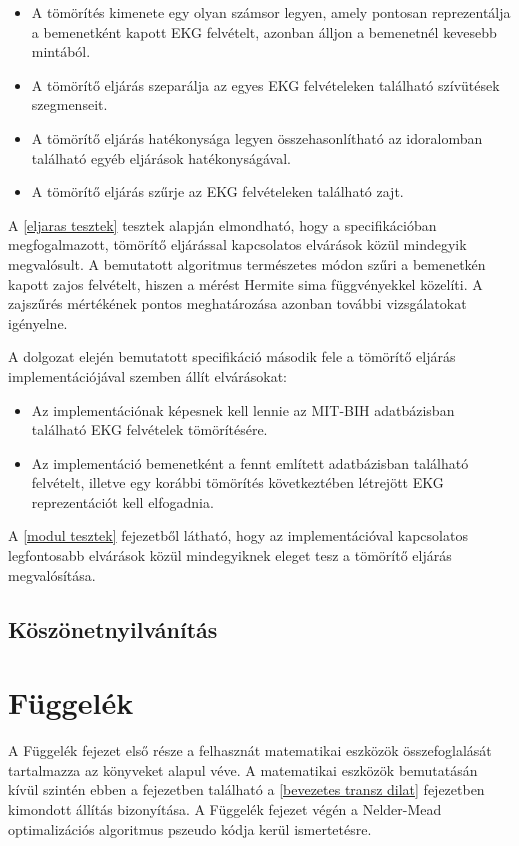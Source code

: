 \documentclass[oneside,titlepage,12pt,a4paper]{report}
\begin{document}
\begin{itemize}
\item A tömörítés kimenete egy olyan számsor legyen, amely pontosan reprezentálja a bemenetként kapott EKG felvételt, azonban álljon a bemenetnél kevesebb mintából.
\item A tömörítő eljárás szeparálja az egyes EKG felvételeken található szívütések szegmenseit. 
\item A tömörítő eljárás hatékonysága legyen összehasonlítható az idoralomban található egyéb eljárások hatékonyságával. 
\item A tömörítő eljárás szűrje az EKG felvételeken található zajt.
\end{itemize}

A \ref{eljaras tesztek} tesztek alapján elmondható, hogy a specifikációban megfogalmazott, tömörítő eljárással kapcsolatos elvárások közül mindegyik megvalósult. A bemutatott algoritmus természetes módon szűri a bemenetkén kapott zajos felvételt, hiszen a mérést Hermite sima függvényekkel közelíti. A zajszűrés mértékének pontos meghatározása azonban további vizsgálatokat igényelne. 
\par A dolgozat elején bemutatott specifikáció második fele a tömörítő eljárás implementációjával szemben állít elvárásokat:

\begin{itemize}
\item Az implementációnak képesnek kell lennie az MIT-BIH adatbázisban található EKG felvételek tömörítésére. 
\item Az implementáció bemenetként a fennt említett adatbázisban található felvételt, illetve egy korábbi tömörítés következtében létrejött EKG reprezentációt kell elfogadnia.
\end{itemize} 

A \ref{modul tesztek} fejezetből látható, hogy az implementációval kapcsolatos legfontosabb elvárások közül mindegyiknek eleget tesz a tömörítő eljárás megvalósítása.  

\section{Köszönetnyilvánítás}



\chapter{Függelék}

A Függelék fejezet első része a felhasznát matematikai eszközök összefoglalását tartalmazza az \cite{szego, szoke} könyveket alapul véve. A matematikai eszközök bemutatásán kívül szintén ebben a fejezetben található a \ref{bevezetes transz dilat} fejezetben kimondott állítás bizonyítása. A Függelék fejezet végén a Nelder-Mead optimalizációs algoritmus pszeudo kódja kerül ismertetésre. 
\end{document}
